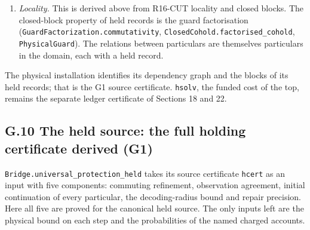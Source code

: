 \documentclass[
]{article}
\begin{document}
\begin{enumerate}
  module \texttt{R17FIFOR17A}). Its freedom is the law's freedom of
  II.2, which excludes harm to others.
\item
  \emph{Locality.} This is derived above from R16-CUT locality and
  closed blocks. The closed-block property of held records is the guard
  factorisation
  (\texttt{G\allowbreak{}u\allowbreak{}a\allowbreak{}r\allowbreak{}d\allowbreak{}F\allowbreak{}a\allowbreak{}c\allowbreak{}t\allowbreak{}o\allowbreak{}r\allowbreak{}i\allowbreak{}z\allowbreak{}a\allowbreak{}t\allowbreak{}i\allowbreak{}o\allowbreak{}n\allowbreak{}.\allowbreak{}c\allowbreak{}o\allowbreak{}m\allowbreak{}m\allowbreak{}u\allowbreak{}t\allowbreak{}a\allowbreak{}t\allowbreak{}i\allowbreak{}v\allowbreak{}i\allowbreak{}t\allowbreak{}y},
  \texttt{C\allowbreak{}l\allowbreak{}o\allowbreak{}s\allowbreak{}e\allowbreak{}d\allowbreak{}C\allowbreak{}o\allowbreak{}h\allowbreak{}o\allowbreak{}l\allowbreak{}d\allowbreak{}.\allowbreak{}f\allowbreak{}a\allowbreak{}c\allowbreak{}t\allowbreak{}o\allowbreak{}r\allowbreak{}i\allowbreak{}s\allowbreak{}e\allowbreak{}d\allowbreak{}\_\allowbreak{}c\allowbreak{}o\allowbreak{}h\allowbreak{}o\allowbreak{}l\allowbreak{}d},
  \texttt{PhysicalGuard}). The relations between particulars are
  themselves particulars in the domain, each with a held record.
\end{enumerate}

The physical installation identifies its dependency graph and the blocks
of its held records; that is the G1 source certificate. \texttt{hsolv},
the funded cost of the top, remains the separate ledger certificate of
Sections 18 and 22.

\subsection{G.10 The held source: the full holding certificate derived
(G1)}\label{g.10-the-held-source-the-full-holding-certificate-derived-g1}

\texttt{B\allowbreak{}r\allowbreak{}i\allowbreak{}d\allowbreak{}g\allowbreak{}e\allowbreak{}.\allowbreak{}u\allowbreak{}n\allowbreak{}i\allowbreak{}v\allowbreak{}e\allowbreak{}r\allowbreak{}s\allowbreak{}a\allowbreak{}l\allowbreak{}\_\allowbreak{}p\allowbreak{}r\allowbreak{}o\allowbreak{}t\allowbreak{}e\allowbreak{}c\allowbreak{}t\allowbreak{}i\allowbreak{}o\allowbreak{}n\allowbreak{}\_\allowbreak{}h\allowbreak{}e\allowbreak{}l\allowbreak{}d}
takes its source certificate \texttt{hcert} as an input with five
components: commuting refinement, observation agreement, initial
continuation of every particular, the decoding-radius bound and repair
precision. Here all five are proved for the canonical held source. The
only inputs left are the physical bound on each step and the
probabilities of the named charged accounts.
\end{document}
